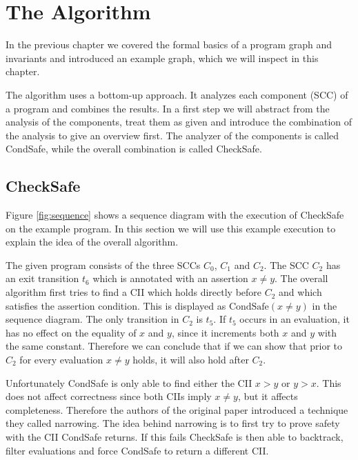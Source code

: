 \section{The Algorithm}
\label{sec:topic}

In the previous chapter we covered the formal basics of a program graph and invariants and introduced an example graph, which we will inspect in this chapter.

The algorithm uses a bottom-up approach. It analyzes each component (SCC) of a program and combines the results.
In a first step we will abstract from the analysis of the components, treat them as given and introduce the combination of the analysis to give an overview first.
The analyzer of the components is called CondSafe, while the overall combination is called CheckSafe.

\subsection{CheckSafe}



Figure \ref{fig:sequence} shows a sequence diagram with the execution of CheckSafe on the example program.
In this section we will use this example execution to explain the idea of the overall algorithm. 

The given program consists of the three SCCs $C_0$, $C_1$ and $C_2$.
The SCC $C_2$ has an exit transition $t_6$ which is annotated with an assertion $x \neq y$.
The overall algorithm first tries to find a CII which holds directly before $C_2$ and which satisfies the assertion condition.
This is displayed as $\text{CondSafe}(x \neq y)$ in the sequence diagram.
The only transition in $C_2$ is $t_5$. If $t_5$ occurs in an evaluation, it has no effect on the equality of $x$ and $y$, since it increments both $x$ and $y$ with the same constant.
Therefore we can conclude that if we can show that prior to $C_2$ for every evaluation $x \neq y$ holds, it will also hold after $C_2$.

Unfortunately CondSafe is only able to find either the CII $x > y$ or $y > x$. This does not affect correctness since both CIIs imply $x \neq y$, but it affects completeness.
Therefore the authors of the original paper introduced a technique they called narrowing.
The idea behind narrowing is to first try to prove safety with the CII CondSafe returns.
If this fails CheckSafe is then able to backtrack, filter evaluations and force CondSafe to return a different CII.

